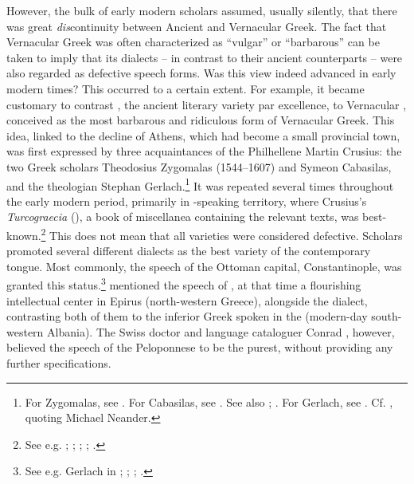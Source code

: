 However, the bulk of early modern scholars assumed, usually silently, that there was great \textit{dis}continuity between Ancient and Vernacular Greek. The fact that Vernacular Greek was often characterized as “vulgar” or “barbarous” can be taken to imply that its dialects – in contrast to their ancient counterparts – were also regarded as defective speech forms. Was this view indeed advanced in early modern times? This occurred to a certain extent. For example, it became customary to contrast , the ancient literary variety par excellence, to Vernacular , conceived as the most barbarous and ridiculous form of Vernacular Greek. This idea, linked to the decline of Athens, which had become a small provincial town, was first expressed by three acquaintances of the  Philhellene Martin Crusius: the two Greek scholars Theodosius Zygomalas (1544–1607) and Symeon Cabasilas, and the  theologian Stephan Gerlach.\footnote{For Zygomalas, see \citet[99, 216]{Crusius1584}. For Cabasilas, see \citet[461]{Crusius1584}. See also \citet[91]{Rotolo1973}; \citet[185, 189–190]{Rhoby2002}. For Gerlach, see \citet[489]{Crusius1584}. Cf. \citet[194]{Ben-tov2013}, quoting Michael Neander.} It was repeated several times throughout the early modern period, primarily in -speaking territory, where Crusius’s \textit{Turcograecia} (\citeyear{Crusius1584}), a book of miscellanea containing the relevant texts, was best-known.\footnote{See e.g. \citet[215]{Becman1673}; \citet[\textsc{a.3}\textsc{\textsuperscript{v}}]{Rodigast1685}; \citet[\textsc{ii}.824]{Hofmann1698}; \citet[1135]{[frisch]1730}; \citet[9]{Gedike1782}.} This does not mean that all  varieties were considered defective. Scholars promoted several different dialects as the best variety of the contemporary tongue. Most commonly, the speech of the Ottoman capital, Constantinople, was granted this status.\footnote{See e.g. Gerlach in \citet[489]{Crusius1584}; \citet[215]{Becman1673}; \citet[74]{Blount1680}; \citet[vii]{Du1688}.} \citet[a.4\textsc{\textsuperscript{v}}, a.7\textsc{\textsuperscript{r}}]{Tribbechow1705} mentioned the speech of , at that time a flourishing intellectual center in Epirus (north-western Greece), alongside the  dialect, contrasting both of them to the inferior Greek spoken in the  (modern-day south-western Albania). The Swiss doctor and language cataloguer Conrad \citet[47\textsc{\textsuperscript{r}}]{Gessner1555}, however, believed the speech of the Peloponnese to be the purest, without providing any further specifications.

